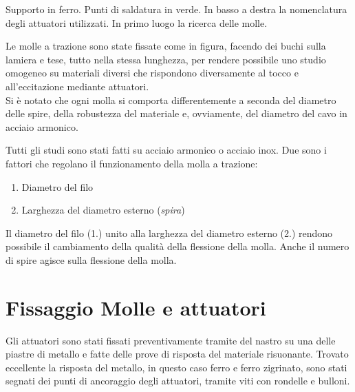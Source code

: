 Supporto in ferro. Punti di saldatura in verde. In basso a destra la nomenclatura degli attuatori utilizzati.
In primo luogo la ricerca delle molle.

Le molle a trazione sono state fissate come in figura, facendo dei buchi sulla lamiera e tese, tutto nella stessa lunghezza, per rendere possibile uno studio omogeneo su materiali diversi che rispondono diversamente al tocco e all'eccitazione mediante attuatori.\\
Si è notato che ogni molla si comporta differentemente a seconda del diametro delle spire, della robustezza del materiale e, ovviamente, del diametro del cavo in acciaio armonico.
%

Tutti gli studi sono stati fatti su acciaio armonico o acciaio inox. Due sono i fattori che regolano il funzionamento della molla a trazione:

\begin{enumerate}
\item{Diametro del filo}
\item{Larghezza del diametro esterno (\textit{spira})}
\end{enumerate}

Il diametro del filo (1.) unito alla larghezza del diametro esterno (2.) rendono possibile il cambiamento della qualità della flessione della molla. Anche il numero di spire agisce sulla flessione della molla.

\section{Fissaggio Molle e attuatori}

Gli attuatori sono stati fissati preventivamente tramite del nastro su una delle piastre di metallo e fatte delle prove di risposta del materiale risuonante. Trovato eccellente la risposta del metallo, in questo caso ferro e ferro zigrinato, sono stati segnati dei punti di ancoraggio degli attuatori, tramite viti con rondelle e bulloni.

